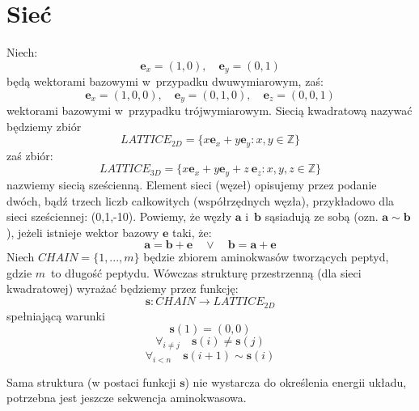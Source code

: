 \documentclass[a4paper,11pt,twoside]{book}
\begin{document}
\section{Sieć}
Niech:
\begin{displaymath}
\mathbf{e}_x = (1,0), \quad \mathbf{e}_y = (0,1)
\end{displaymath}
będą wektorami bazowymi w~przypadku dwuwymiarowym, zaś:
\begin{displaymath}
\mathbf{e}_x = (1,0,0),\quad \mathbf{e}_y = (0,1,0),\quad \mathbf{e}_z = (0,0,1)
\end{displaymath}
wektorami bazowymi w~przypadku trójwymiarowym. Siecią kwadratową nazywać będziemy zbiór
\begin{displaymath}
LATTICE_{2D} = \{ x\mathbf{e}_x + y\mathbf{e}_y : x, y \in \mathbb{Z}   \}
\end{displaymath}
zaś zbiór:
\begin{displaymath}
LATTICE_{3D} = \{ x\mathbf{e}_x + y\mathbf{e}_y + z~\mathbf{e}_z : x, y,z \in \mathbb{Z}   \}
\end{displaymath}
nazwiemy siecią sześcienną. Element sieci (węzeł) opisujemy przez podanie dwóch, bądź trzech liczb całkowitych (współrzędnych węzła), przykładowo dla sieci sześciennej: (0,1,-10). Powiemy, że węzły $\mathbf{a}$ i~$\mathbf{b}$ sąsiadują ze sobą (ozn. $\mathbf{a} \sim \mathbf{b}$), jeżeli istnieje wektor bazowy $\mathbf{e}$ taki, że:
\begin{displaymath}
\mathbf{a} = \mathbf{b} + \mathbf{e}  \quad \vee \quad \mathbf{b} = \mathbf{a} + \mathbf{e}
\end{displaymath}
Niech $CHAIN = \{1, ..., m\}$ będzie zbiorem aminokwasów tworzących peptyd, gdzie $m$~to długość peptydu. Wówczas strukturę przestrzenną (dla sieci kwadratowej) wyrażać będziemy przez funkcję:
\begin{displaymath}
\mathbf{s} \colon CHAIN \to LATTICE_{2D}
\end{displaymath}
spełniającą warunki 
\begin{displaymath}
\mathbf{s}(1) = (0,0)
\end{displaymath}
\begin{displaymath}
\forall_{i \neq j} \quad \mathbf{s}(i) \neq \mathbf{s}(j)
\end{displaymath}
\begin{displaymath}
\forall_{i<n} \quad \mathbf{s}(i+1) \sim \mathbf{s}(i)
\end{displaymath}

Sama struktura (w postaci funkcji $\mathbf{s}$) nie wystarcza do określenia energii układu, potrzebna jest jeszcze sekwencja aminokwasowa.
\end{document}
